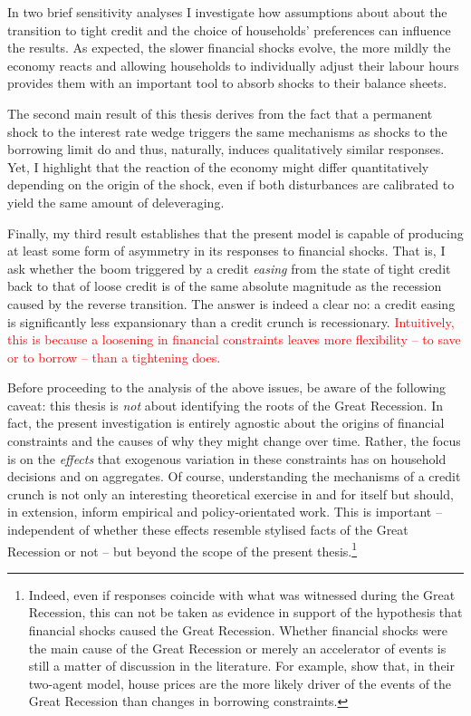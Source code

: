 \documentclass[a4paper,12pt]{article} %
\numberwithin{equation}{section} %
\numberwithin{figure}{section}
\numberwithin{table}{section}
\begin{document}
In two brief sensitivity analyses I investigate how assumptions about about the transition to tight credit and the choice of households' preferences can influence the results. As expected, the slower financial shocks evolve, the more mildly the economy reacts and allowing households to individually adjust their labour hours provides them with an important tool to absorb shocks to their balance sheets.

The second main result of this thesis derives from the fact that a permanent shock to the interest rate wedge triggers the same mechanisms as shocks to the borrowing limit do and thus, naturally, induces qualitatively similar responses. Yet, I highlight that the reaction of the economy might differ quantitatively depending on the origin of the shock, even if both disturbances are calibrated to yield the same amount of deleveraging.

Finally, my third result establishes that the present model is capable of producing at least some form of asymmetry in its responses to financial shocks. That is, I ask whether the boom triggered by a credit \textit{easing} from the state of tight credit back to that of loose credit is of the same absolute magnitude as the recession caused by the reverse transition. The answer is indeed a clear no: a credit easing is significantly less expansionary than a credit crunch is recessionary. \textcolor{red}{Intuitively, this is because a loosening in financial constraints leaves more flexibility -- to save or to borrow -- than a tightening does.}

Before proceeding to the analysis of the above issues, be aware of the following caveat: this thesis is \textit{not} about identifying the roots of the Great Recession. In fact, the present investigation is entirely agnostic about the origins of financial constraints and the causes of why they might change over time. Rather, the focus is on the \textit{effects} that exogenous variation in these constraints has on household decisions and on aggregates. Of course, understanding the mechanisms of a credit crunch is not only an interesting theoretical exercise in and for itself but should, in extension, inform empirical and policy-orientated work. This is important -- independent of whether these effects resemble stylised facts of the Great Recession or not -- but beyond the scope of the present thesis.\footnote{Indeed, even if responses coincide with what was witnessed during the Great Recession, this can not be taken as evidence in support of the hypothesis that financial shocks caused the Great Recession. Whether financial shocks were the main cause of the Great Recession or merely an accelerator of events is still a matter of discussion in the literature. For example, \textcite{justiniano2015} show that, in their two-agent model, house prices are the more likely driver of the events of the Great Recession than changes in borrowing constraints.}
\end{document}
